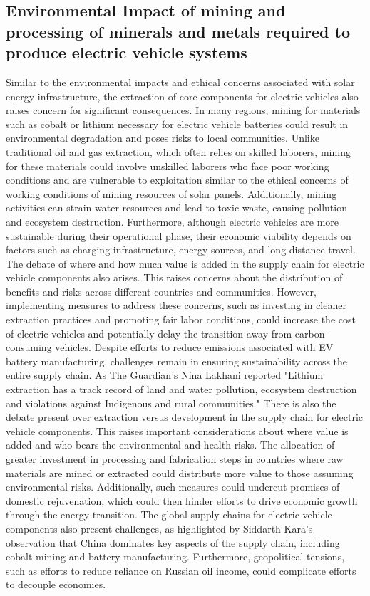 \documentclass[10pt,twocolumn]{article}
\begin{document}
\subsection{Environmental Impact of mining and processing of minerals and metals required to produce electric vehicle systems}
Similar to the environmental impacts and ethical concerns associated with solar energy infrastructure, the extraction of core components for electric vehicles also raises concern for significant consequences. In many regions, mining for materials such as cobalt or lithium necessary for electric vehicle batteries could result in environmental degradation and poses risks to local communities. Unlike traditional oil and gas extraction, which often relies on skilled laborers, mining for these materials could involve unskilled laborers who face poor working conditions and are vulnerable to exploitation similar to the ethical concerns of working conditions of mining resources of solar panels. Additionally, mining activities can strain water resources and lead to toxic waste, causing pollution and ecosystem destruction. Furthermore, although electric vehicles are more sustainable during their operational phase, their economic viability depends on factors such as charging infrastructure, energy sources, and long-distance travel. The debate of where and how much value is added in the supply chain for electric vehicle components also arises. This raises concerns about the distribution of benefits and risks across different countries and communities. However, implementing measures to address these concerns, such as investing in cleaner extraction practices and promoting fair labor conditions, could increase the cost of electric vehicles and potentially delay the transition away from carbon-consuming vehicles. Despite efforts to reduce emissions associated with EV battery manufacturing, challenges remain in ensuring sustainability across the entire supply chain. As The Guardian's Nina Lakhani reported "Lithium extraction has a track record of land and water pollution, ecosystem destruction and violations against Indigenous and rural communities." There is also the  debate present over extraction versus development in the supply chain for electric vehicle components. This raises important considerations about where value is added and who bears the environmental and health risks. The allocation of greater investment in processing and fabrication steps in countries where raw materials are mined or extracted could distribute more value to those assuming environmental risks. Additionally, such measures could undercut promises of domestic rejuvenation, which could then hinder efforts to drive economic growth through the energy transition. The global supply chains for electric vehicle components also present challenges, as highlighted by Siddarth Kara's observation that China dominates key aspects of the supply chain, including cobalt mining and battery manufacturing. Furthermore, geopolitical tensions, such as efforts to reduce reliance on Russian oil income, could complicate efforts to decouple economies. 
\end{document}
